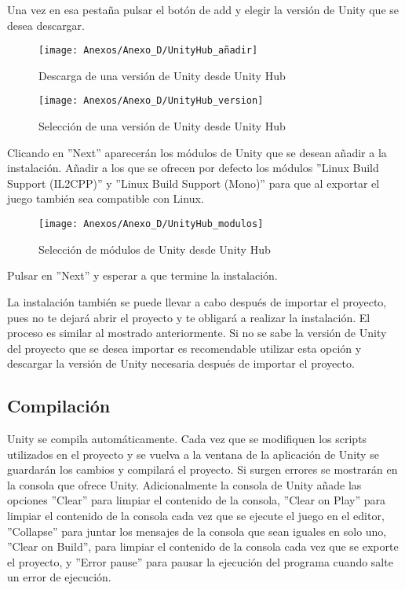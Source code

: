 Una vez en esa pestaña pulsar el botón de add y elegir la versión de Unity que se desea descargar.

\begin{figure}[h]
\centering
\texttt{[image: Anexos/Anexo\_D/UnityHub\_añadir]}
\caption{Descarga de una versión de Unity desde Unity Hub}
\end{figure}

\clearpage
\begin{figure}[h]
\centering
\texttt{[image: Anexos/Anexo\_D/UnityHub\_version]}
\caption{Selección de una versión de Unity desde Unity Hub}
\end{figure}

Clicando en ''Next'' aparecerán los módulos de Unity que se desean añadir a la instalación. Añadir a los que se ofrecen por defecto los módulos ''Linux Build Support (IL2CPP)'' y ''Linux Build Support (Mono)'' para que al exportar el juego también sea compatible con Linux.

\begin{figure}[h]
\centering
\texttt{[image: Anexos/Anexo\_D/UnityHub\_modulos]}
\caption{Selección de módulos de Unity desde Unity Hub}
\end{figure}

Pulsar en ''Next'' y esperar a que termine la instalación.

La instalación también se puede llevar a cabo después de importar el proyecto, pues no te dejará abrir el proyecto y te obligará a realizar la instalación. El proceso es similar al mostrado anteriormente. Si no se sabe la versión de Unity del proyecto que se desea importar es recomendable utilizar esta opción y descargar la versión de Unity necesaria después de importar el proyecto.

\subsection{Compilación}
Unity se compila automáticamente. Cada vez que se modifiquen los scripts utilizados en el proyecto y se vuelva a la ventana de la aplicación de Unity se guardarán los cambios y compilará el proyecto. Si surgen errores se mostrarán en la consola que ofrece Unity.
 Adicionalmente la consola de Unity añade las opciones ''Clear'' para limpiar el contenido de la consola, ''Clear on Play'' para limpiar el contenido de la consola cada vez que se ejecute el juego en el editor, ''Collapse'' para juntar los mensajes de la consola que sean iguales en solo uno, ''Clear on Build'', para limpiar el contenido de la consola cada vez que se exporte el proyecto, y ''Error pause'' para pausar la ejecución del programa cuando salte un error de ejecución.

